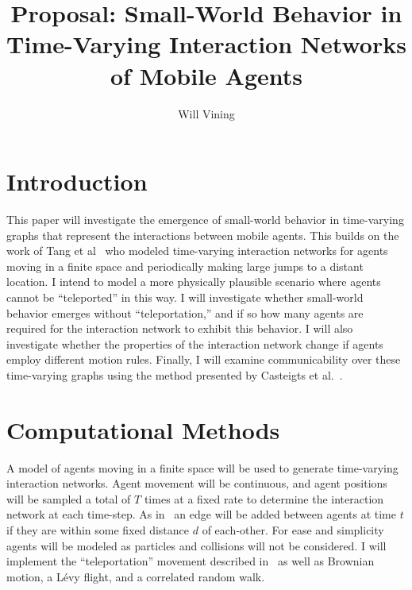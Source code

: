 \documentclass{article}
\title{Proposal: Small-World Behavior in Time-Varying Interaction Networks of
  Mobile Agents}
\author{Will Vining}
\begin{document}
\maketitle

\section{Introduction}
This paper will investigate the emergence of small-world behavior in
time-varying graphs that represent the interactions between mobile
agents. This builds on the work of Tang et al~\cite{Tang2010} who
modeled time-varying interaction networks for agents moving in a
finite space and periodically making large jumps to a distant
location. I intend to model a more physically plausible scenario where
agents cannot be ``teleported'' in this way. I will investigate
whether small-world behavior emerges without ``teleportation,'' and if
so how many agents are required for the interaction network to exhibit
this behavior. I will also investigate whether the properties of the
interaction network change if agents employ different motion
rules. Finally, I will examine communicability over these time-varying
graphs using the method presented by Casteigts et
al.~\cite{Grindrod2011}.

\section{Computational Methods}
\label{sec:comp-methods}
A model of agents moving in a finite space will be used to generate
time-varying interaction networks. Agent movement will be continuous,
and agent positions will be sampled a total of $T$ times at a fixed
rate to determine the interaction network at each time-step. As
in~\cite{Tang2010} an edge will be added between agents at time $t$ if
they are within some fixed distance $d$ of each-other. For ease and
simplicity agents will be modeled as particles and collisions will not
be considered.  I will implement the ``teleportation'' movement
described in~\cite{Tang2010} as well as Brownian motion, a L{\'e}vy
flight, and a correlated random walk.

\end{document}
